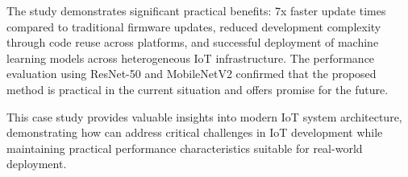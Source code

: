 \documentclass[11pt]{article}
\begin{document}
The study demonstrates significant practical benefits: 7x faster update times compared to traditional firmware updates, reduced development complexity through code reuse across platforms, and successful deployment of machine learning models across heterogeneous IoT infrastructure. The performance evaluation using ResNet-50 and MobileNetV2 confirmed that the proposed method is practical in the current situation and offers promise for the future.

This case study provides valuable insights into modern IoT system architecture, demonstrating how \cite{webassembly2023} can address critical challenges in IoT development while maintaining practical performance characteristics suitable for real-world deployment.



\end{document}
